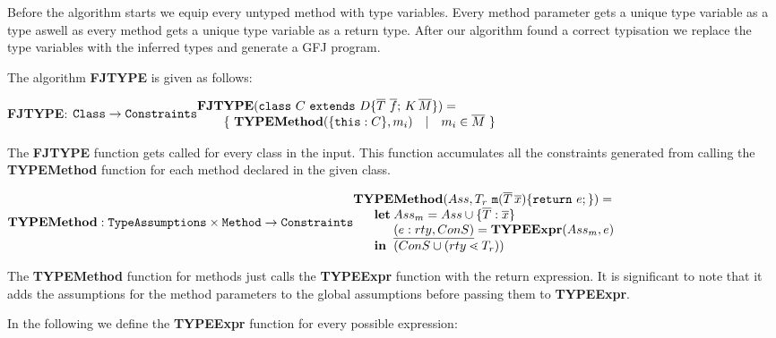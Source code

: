 \documentclass[runningheads]{llncs}
\begin{document}
Before the algorithm starts we equip every untyped method with type variables.
Every method parameter gets a unique type variable as a type aswell as every method gets a unique type variable as a return type.
After our algorithm found a correct typisation we replace the type variables with the inferred types and generate a GFJ program.

The algorithm \textbf{FJTYPE} is given as follows:

\textbf{FJTYPE}:
$
\texttt{Class} \rightarrow \texttt{Constraints}\\
 \begin{array}{@{}l@{}l@{}l}
 \textbf{FJT}&\textbf{Y} & \textbf{PE}(\mathtt{class } \ C \ \mathtt{ extends } \ D \{ \overline{T} \ \overline{f}; \, K \, \overline{M} \}) =\\
& \multicolumn{2}{@{}l@{}}{ \{ \ \textbf{TYPEMethod}(\{ \mathtt{this} : C \}, m_i) \quad | \quad m_i \in \overline{M} \ \} }\\ 
\end{array}$

The \textbf{FJTYPE} function gets called for every class in the input.
This function accumulates all the constraints generated from calling the
\textbf{TYPEMethod} function for each method declared in the given class.

$\textbf{TYPEMethod}:\texttt{TypeAssumptions} \times
\texttt{Method} \rightarrow \texttt{Constraints}\\
\begin{array}{@{}l@{}l@{}l}
\textbf{TY}& \textbf{PE} & \textbf{Method} (Ass, T_r \ \mathtt{m}(\overline{T} \, \overline{x})\{ \mathtt{ return }\ e; \}) =\\
& \textbf{let}
& Ass_m = Ass \cup \{ \overline{T} : \overline{x} \}\\
& & \ul{(e:rty, ConS)} = \textbf{TYPEExpr}(Ass_m, e)\\
& \mathbf{in}
& (ConS \cup (rty \lessdot T_r))\\
\end{array}
$

The \textbf{TYPEMethod} function for methods just calls the \textbf{TYPEExpr} function with the
return expression. It is significant to note that it adds the assumptions for the method parameters to the global assumptions before passing them to \textbf{TYPEExpr}.

\smallskip

In the following we define the \textbf{TYPEExpr} function for every possible expression:
\end{document}
